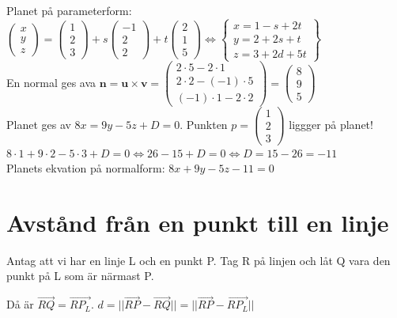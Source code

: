 Planet på parameterform: $\begin{pmatrix}
    x\\y\\z
\end{pmatrix}=\begin{pmatrix}
    1\\2\\3
\end{pmatrix}+s\begin{pmatrix}
    -1\\2\\2
\end{pmatrix}+t\begin{pmatrix}
    2\\1\\5
\end{pmatrix} \Leftrightarrow \begin{Bmatrix}
    x=1-s+2t\\y=2+2s+t\\z=3+2d+5t
\end{Bmatrix}$\\
En normal ges ava $\bm{n}=\bm{u}\times \bm{v}=\begin{pmatrix}
    2\cdot 5-2\cdot 1\\
    2\cdot 2-(-1)\cdot 5\\
    (-1)\cdot 1-2\cdot 2
\end{pmatrix}=\begin{pmatrix}8\\9\\5\end{pmatrix}$\\
Planet ges av $8x=9y-5z+D=0$.
Punkten $p=\begin{pmatrix}1\\2\\3\end{pmatrix}$ liggger på planet!\\
$8\cdot 1+9\cdot 2-5\cdot 3+D=0\Leftrightarrow 26-15+D=0\Leftrightarrow D=15-26=-11$\\
Planets ekvation på normalform: $8x+9y-5z-11=0$

\section{Avstånd från en punkt till en linje}
Antag att vi har en linje L och en punkt P.
Tag R på linjen och låt Q vara den punkt på L som är närmast P.

Då är $\overrightarrow{RQ}=\overrightarrow{RP_{L}}$.  
$d=||\overrightarrow{RP}-\overrightarrow{RQ}||=||\overrightarrow{RP}-\overrightarrow{RP_{L}}||$    

